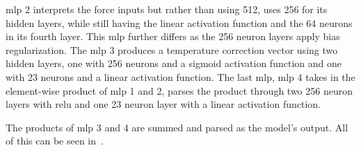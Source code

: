 \gls{mlp} \num{2} interprets the force inputs but rather than using \num{512}, uses \num{256} for its hidden layers, while still having the linear activation function and the \num{64} neurons in its fourth layer. This \gls{mlp} further differs as the \num{256} neuron layers apply  bias regularization. The \gls{mlp} \num{3} produces a temperature correction vector using two hidden layers, one with \num{256} neurons and a sigmoid activation function and one with \num{23} neurons and a linear activation function. The last \gls{mlp}, \gls{mlp} \num{4} takes in the element-wise product of \gls{mlp} \num{1} and \num{2}, parses the product through two \num{256} neuron layers with \gls{relu} and one \num{23} neuron layer with a linear activation function.\medskip

The products of \gls{mlp} \num{3} and \num{4} are summed and parsed as the model's output. All of this can be seen in~.





